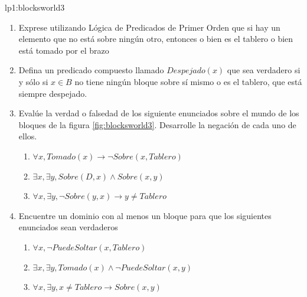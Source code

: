 \begin{defproblem}{lp1:blocksworld3}
\begin{onlyproblem}
		\begin{enumerate}
			\item Exprese utilizando Lógica de Predicados de Primer Orden que si hay un elemento que no está sobre ningún otro, entonces o bien es el tablero o bien está tomado por el brazo
			\item Defina un predicado compuesto llamado $ Despejado(x) $ que sea verdadero si y sólo si $ x \in B $ no tiene ningún bloque sobre sí mismo o es el tablero, que está siempre despejado.
			\item Evalúe la verdad o falsedad de los siguiente enunciados sobre el mundo de los bloques de la figura \ref{fig:blocksworld3}. Desarrolle la negación de cada uno de ellos.
			\begin{enumerate}
				\item $ \forall x, Tomado(x) \rightarrow \neg Sobre(x, Tablero) $
				\item $ \exists x, \exists y, Sobre(D,x) \land Sobre(x,y) $
				\item $ \forall x, \exists y, \neg Sobre(y, x) \rightarrow y \neq Tablero $
			\end{enumerate}
			\item Encuentre un dominio con al menos un bloque para que los siguientes enunciados sean verdaderos
			\begin{enumerate}
				\item $ \forall x, \neg PuedeSoltar(x, Tablero) $
				\item $ \exists x, \exists y, Tomado(x) \land \neg PuedeSoltar(x,y) $
				\item $ \forall x, \exists y,  x \neq Tablero \rightarrow Sobre(x, y) $
			\end{enumerate}
		\end{enumerate}
		

\end{onlyproblem}
\end{defproblem}
